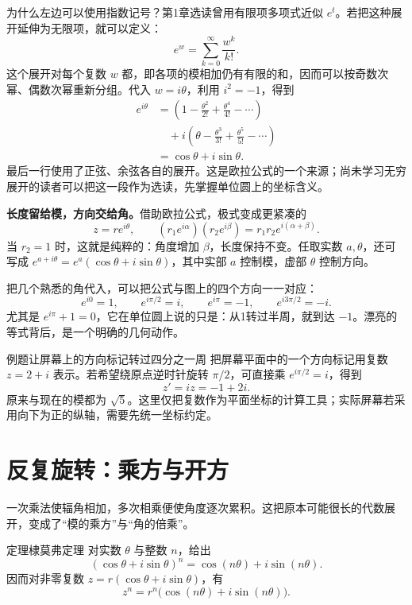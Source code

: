 \documentclass[a4paper,12pt,twoside,openany,fontset=none]{ctexbook}
\let\oldsum\sum
\renewcommand{\sum}{\displaystyle\oldsum}
\newcounter{theorem}[chapter]
\newenvironment{theorem}[1][]{\begin{thmBox}{定理}{#1}}{\end{thmBox}}
\newcounter{example}[chapter]
\newenvironment{example}[1][]{\begin{exBox}{例题}{#1}}{\end{exBox}}
\numberwithin{equation}{chapter}
\begin{document}
为什么左边可以使用指数记号？第1章选读曾用有限项多项式近似 $e^t$。若把这种展开延伸为无限项，就可以定义：
\[
    e^w=\sum_{k=0}^{\infty}\frac{w^k}{k!}.
\]
这个展开对每个复数 $w$ 都，即各项的模相加仍有有限的和，因而可以按奇数次幂、偶数次幂重新分组。代入 $w=i\theta$，利用 $i^2=-1$，得到
\[
\begin{aligned}
    e^{i\theta}
    &=\left(1-\frac{\theta^2}{2!}+\frac{\theta^4}{4!}-\cdots\right)\\
    &\quad+i\left(\theta-\frac{\theta^3}{3!}+\frac{\theta^5}{5!}-\cdots\right)\\
    &=\cos\theta+i\sin\theta.
\end{aligned}
\]
最后一行使用了正弦、余弦各自的展开。这是欧拉公式的一个来源；尚未学习无穷展开的读者可以把这一段作为选读，先掌握单位圆上的坐标含义。

\textbf{长度留给模，方向交给角。}借助欧拉公式，极式变成更紧凑的
\[
    z=re^{i\theta},\qquad
    (r_1e^{i\alpha})(r_2e^{i\beta})=r_1r_2e^{i(\alpha+\beta)}.
\]
当 $r_2=1$ 时，这就是纯粹的：角度增加 $\beta$，长度保持不变。任取实数 $a,\theta$，还可写成 $e^{a+i\theta}=e^a(\cos\theta+i\sin\theta)$，其中实部 $a$ 控制模，虚部 $\theta$ 控制方向。

把几个熟悉的角代入，可以把公式与图上的四个方向一一对应：
\[
    e^{i0}=1,\qquad e^{i\pi/2}=i,\qquad
    e^{i\pi}=-1,\qquad e^{i3\pi/2}=-i.
\]
尤其是 $e^{i\pi}+1=0$，它在单位圆上说的只是：从1转过半周，就到达 $-1$。漂亮的等式背后，是一个明确的几何动作。

\begin{example}[让屏幕上的方向标记转过四分之一周]
把屏幕平面中的一个方向标记用复数 $z=2+i$ 表示。若希望绕原点逆时针旋转 $\pi/2$，可直接乘 $e^{i\pi/2}=i$，得到
\[
    z'=iz=-1+2i.
\]
原来与现在的模都为 $\sqrt5$。这里仅把复数作为平面坐标的计算工具；实际屏幕若采用向下为正的纵轴，需要先统一坐标约定。
\end{example}

\section{反复旋转：乘方与开方}

一次乘法使辐角相加，多次相乘便使角度逐次累积。这把原本可能很长的代数展开，变成了“模的乘方”与“角的倍乘”。

\begin{theorem}[棣莫弗定理]
对实数 $\theta$ 与整数 $n$，\textbf{}给出
\[
    (\cos\theta+i\sin\theta)^n
    =\cos(n\theta)+i\sin(n\theta).
\]
因而对非零复数 $z=r(\cos\theta+i\sin\theta)$，有
\[
    z^n=r^n\bigl(\cos(n\theta)+i\sin(n\theta)\bigr).
\]
\end{theorem}
\end{document}
